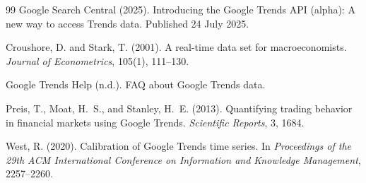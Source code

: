\documentclass[12pt,a4paper,oneside]{article}
\begin{document}
\begin{thebibliography}{99}
Google Search Central (2025). Introducing the Google Trends API (alpha): A new
way to access Trends data. Published 24 July 2025.

Croushore, D. and Stark, T. (2001). A real-time data set for macroeconomists.
\textit{Journal of Econometrics}, 105(1), 111--130.

Google Trends Help (n.d.). FAQ about Google Trends data.

Preis, T., Moat, H.~S., and Stanley, H.~E. (2013). Quantifying trading behavior
in financial markets using Google Trends. \textit{Scientific Reports}, 3, 1684.

West, R. (2020). Calibration of Google Trends time series. In
\textit{Proceedings of the 29th ACM International Conference on Information and
Knowledge Management}, 2257--2260.

\end{thebibliography}
\end{document}
